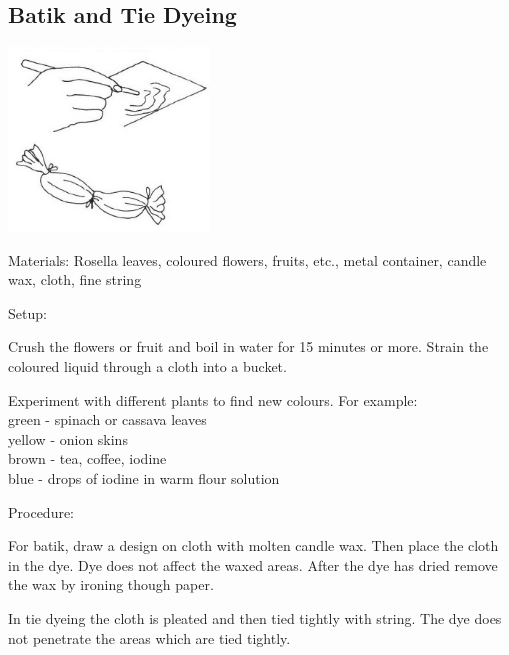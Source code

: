 \begin{multicols}{2}
\vfill
\columnbreak

\subsection{Batik and Tie Dyeing}

\begin{center}
\includegraphics[width=0.4\textwidth]{./img/vso/tie-dyeing.jpg}
\end{center}

\begin{description*}
\item[Materials:]{Rosella leaves, coloured flowers, fruits, etc., metal container, candle wax, cloth, fine string}
\item[Setup:]{Crush the flowers or fruit and boil in water for 15 minutes or more. Strain the coloured liquid through a cloth into a bucket.

Experiment with different plants to find new colours. For example:\\
green - spinach or cassava leaves\\
yellow - onion skins\\
brown - tea, coffee, iodine\\
blue - drops of iodine in warm flour solution}
\item[Procedure:]{For batik, draw a design on cloth with molten candle wax. Then place the cloth in the dye. Dye does not affect the waxed areas. After the dye has dried remove the wax by ironing though paper.

In tie dyeing the cloth is pleated and then tied tightly with string. The dye does not penetrate the areas which are tied tightly.}
\end{description*}



\end{multicols}

\pagebreak